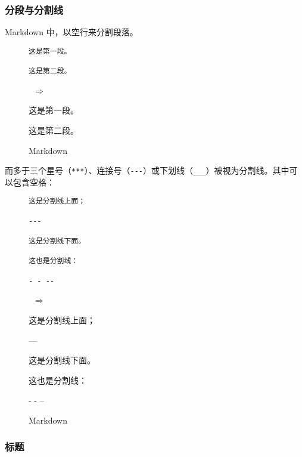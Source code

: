 \documentclass[a4paper,fontset=none]{ctexart}
\begin{document}
\subsubsection{分段与分割线}

Markdown 中，以空行来分割段落。

\begin{figure}[H]
    \centering
    \begin{minipage}{0.45\textwidth}
        \begin{verbatim}
这是第一段。

这是第二段。
        \end{verbatim}
    \end{minipage}
    \, $\Longrightarrow$ \,
    \begin{minipage}{0.45\textwidth}
\begin{markdown}
这是第一段。

这是第二段。
\end{markdown}
    \end{minipage}
    \caption{Markdown}
\end{figure}

而多于三个星号（\verb|***|）、连接号（\verb|---|）或下划线（\verb|___|）被视为分割线。其中可以包含空格：

\begin{figure}[H]
    \centering
    \begin{minipage}{0.45\textwidth}
        \begin{verbatim}
这是分割线上面；

---

这是分割线下面。

这也是分割线：

- - --
        \end{verbatim}
    \end{minipage}
    \, $\Longrightarrow$ \,
    \begin{minipage}{0.45\textwidth}
\begin{markdown}
这是分割线上面；

---

这是分割线下面。

这也是分割线：

- - --
\end{markdown}
    \end{minipage}
    \caption{Markdown}
\end{figure}

\subsubsection{标题}
\end{document}
